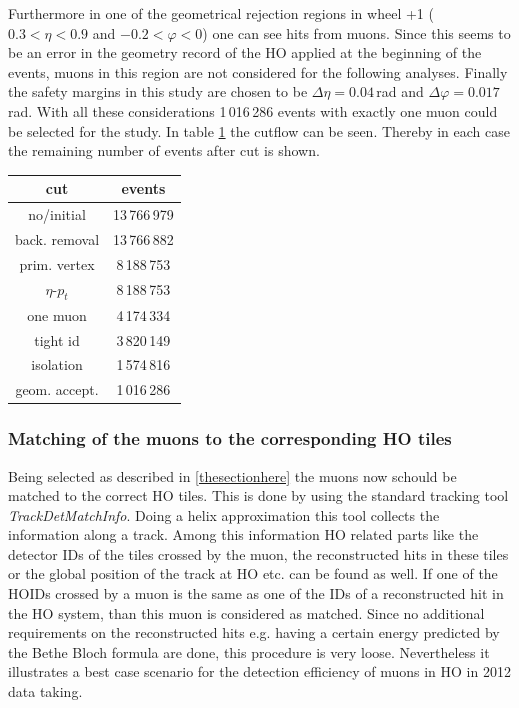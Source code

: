 			Furthermore in one of the geometrical rejection regions in wheel +1 ($0.3<\eta<0.9$ and $-0.2<\varphi<0$) one can see hits from muons.
			Since this seems to be an error in the geometry record of the HO applied at the beginning of the events, muons in this region are not considered for the following analyses.
			Finally the safety margins in this study are chosen to be $\Delta\eta = 0.04$\,rad and $\Delta\varphi = 0.017$\,rad.
			With all these considerations 1\,016\,286 events with exactly one muon could be selected for the study.
			In table \ref{CutFlow} the cutflow can be seen.
			Thereby in each case the remaining number of events after cut is shown.
			\begin{table}[htbH]
				\begin{center}
				\label{CutFlow}
					\begin{tabular}{|c|c|}
						\hline
						\textbf{cut}  & \textbf{events} \\ \hline \hline
			 			no/initial    & 13\,766\,979 		\\ \hline
			 			back. removal & 13\,766\,882 		\\ \hline
			 			prim. vertex  &  8\,188\,753 		\\ \hline
			 			$\eta$-$p_t$  &  8\,188\,753 		\\ \hline
			 			one muon      &  4\,174\,334 		\\ \hline
			 			tight id      &  3\,820\,149 		\\ \hline
			 			isolation     &  1\,574\,816 		\\ \hline
			 			geom. accept. &  1\,016\,286 		\\ \hline
					\end{tabular}
				\end{center}
			\end{table}
		\subsubsection{Matching of the muons to the corresponding HO tiles}
			Being selected as described in \ref{thesectionhere} the muons now schould be matched to the correct HO tiles.
			This is done by using the standard tracking tool \textit{TrackDetMatchInfo}.
			Doing a helix approximation this tool collects the information along a track.
			Among this information HO related parts like the detector IDs of the tiles crossed by the muon, the reconstructed hits in these tiles or the global position of the track at HO etc. can be
			found as well.
			If one of the HOIDs crossed by a muon is the same as one of the IDs of a reconstructed hit in the HO system, than this muon is considered as matched.
			Since no additional requirements on the reconstructed hits e.g. having a certain energy predicted by the Bethe Bloch formula are done, this procedure is very loose.
			Nevertheless it illustrates a best case scenario for the detection efficiency of muons in HO in 2012 data taking.
